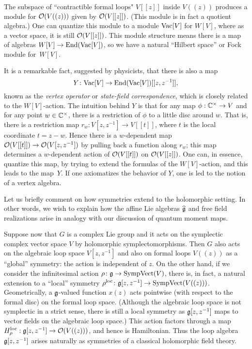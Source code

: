 \documentclass[11pt]{amsart}
\begin{document}
The subspace of ``contractible formal loops" $V[[z]]$ inside $V((z))$ produces a module for $\mathcal O(V((z)))$ given by $\mathcal O(V[[z]])$. 
(This module is in fact a quotient algebra.)
One can quantize this module to a module ${\rm Vac}[V]$ for $W[V]$,
where as a vector space, it is still $\mathcal O(V[[z]])$.
This module structure means there is a map of algebras $W[V] \to {\rm End}({\rm Vac}[V])$,
so we have a natural ``Hilbert space'' or Fock module for~$W[V]$.

It is a remarkable fact, suggested by physicists, that there is also a map
\[
Y \colon {\rm Vac}[V] \to {\rm End}({\rm Vac}[V])[[z, z^{-1}]],
\]
known as the {\em vertex operator} or {\em state-field correspondence},
which is closely related to the $W[V]$-action.
The intuition behind $Y$ is that for any map $\phi: \mathbb C^\times \to V$ and for any point $w \in \mathbb C^\times$, 
there is a restriction of $\phi$ to a little disc around $w$.
That is, there is a restriction map $r_w: V[z,z^{-1}] \to V[[t]]$, where $t$ is the local coordinate $t = z-w$.
Hence there is a $w$-dependent map $\mathcal O(V[[t]]) \to \mathcal O(V[z,z^{-1}])$ by pulling back a function along $r_w$;
this map determines a $w$-dependent action of $\mathcal O(V[[t]])$ on $\mathcal O(V[[z]])$.
One can, in essence, quantize this map, by trying to extend the formulas of the $W[V]$-action,
and this leads to the map~$Y$.
If one axiomatizes the behavior of $Y$, one is led to the notion of a vertex algebra.

Let us briefly comment on how symmetries extend to the holomorphic setting.
In other words, we wish to explain how the affine Lie algebras $\widehat{\mathfrak g}$ and free field realizations arise in analogy with our discussion of quantum moment maps.

Suppose now that $G$ is a complex Lie group and it acts on the symplectic complex vector space $V$ by holomorphic symplectomorphisms.
Then $G$ also acts on the algebraic loop space $V[z,z^{-1}]$ and also on formal loops $V((z))$ as a ``global'' symmetry:
the action is independent of $z$.
On the other hand, if we consider the infinitesimal action $\rho \colon \mathfrak g \to {\rm SympVect}(V)$,
there is, in fact, a natural extension to a ``local'' symmetry $\rho^{\rm loc} \colon \mathfrak g[z,z^{-1}] \to {\rm SympVect}(V((z)))$.
Geometrically, a $\mathfrak g$-valued function $x(z)$ acts pointwise (with respect to the formal disc) on the formal loop space.
(Although the algebraic loop space is not symplectic in a strict sense,
there is still a local symmetry as $\mathfrak g[z,z^{-1}]$ maps to vector fields on the algebraic loop space.)
This action factors through a map $H_\rho^{\rm loc}: \mathfrak g[z,z^{-1}] \to \mathcal O(V((z)))$,
and hence is Hamiltonian.
Thus the loop algebra $\mathfrak g[z,z^{-1}]$ arises naturally as symmetries of a classical holomorphic field theory.
\end{document}
